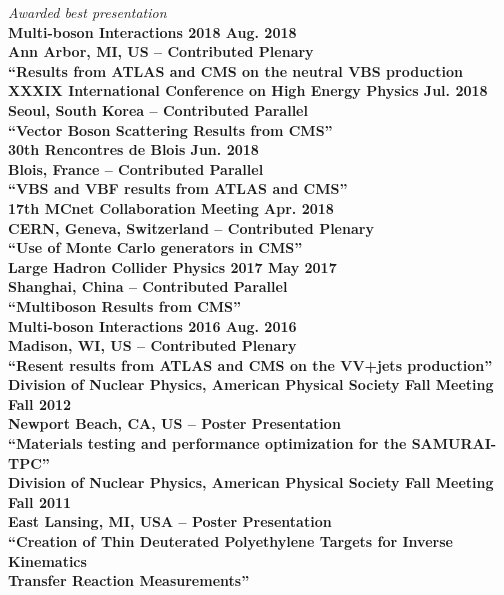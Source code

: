 \documentclass[10pt]{res} %
\begin{document}
\begin{resume}
\begin{tabbing}
\emph{Awarded best presentation } \\
\bf{Multi-boson Interactions 2018} 		 \> \>	    Aug. 2018 \\
Ann Arbor, MI, US -- Contributed Plenary \\
``Results from ATLAS and CMS on the neutral VBS production \\
\bf{XXXIX International Conference on High Energy Physics} 		 \> \>	    Jul. 2018 \\
Seoul, South Korea -- Contributed Parallel\\
``Vector Boson Scattering Results from CMS'' \\
\bf{30th Rencontres de Blois} 		 \> \>	    Jun. 2018 \\
Blois, France -- Contributed Parallel\\
``VBS and VBF results from ATLAS and CMS'' \\
\bf{17th MCnet Collaboration Meeting} 		 \> \>	    Apr. 2018 \\
CERN, Geneva, Switzerland -- Contributed Plenary\\
``Use of Monte Carlo generators in CMS'' \\
\bf{Large Hadron Collider Physics 2017} 		 \> \>	    May 2017 \\
Shanghai, China -- Contributed Parallel \\
``Multiboson Results from CMS'' \\
\bf{Multi-boson Interactions 2016} 		 \> \>	    Aug. 2016 \\
Madison, WI, US -- Contributed Plenary \\
``Resent results from ATLAS and CMS on the VV+jets production'' \\
\bf{Division of Nuclear Physics, American Physical Society Fall Meeting} 		 \> \>	    Fall 2012 \\
Newport Beach, CA, US -- Poster Presentation\\
``Materials testing and performance optimization for the SAMURAI-TPC'' \\
\bf{Division of Nuclear Physics, American Physical Society Fall Meeting} 		 \> \>	    Fall 2011 \\
East Lansing, MI, USA -- Poster Presentation\\ 
``Creation of Thin Deuterated Polyethylene Targets for Inverse Kinematics \\Transfer Reaction Measurements'' \\
\end{tabbing}\vspace{-20pt}      %


\end{resume}
\end{document}
